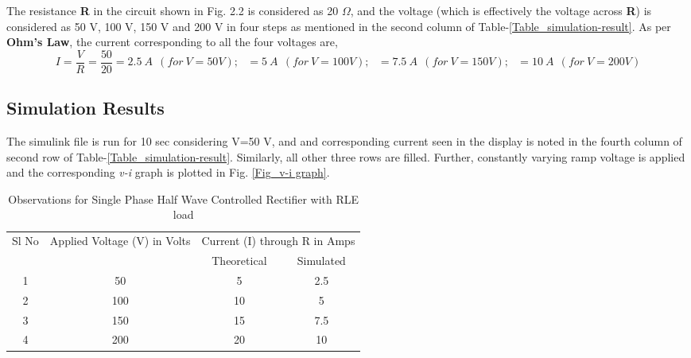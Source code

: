 \hspace{1.5cm} The resistance \textbf{R} in the circuit shown in Fig. 2.2 is considered as 20 $\Omega$, and the voltage (which is effectively the voltage across \textbf{R}) is considered as 50 V, 100 V, 150 V and 200 V in four steps as mentioned in the second column of Table-\ref{Table_simulation-result}. As per \textbf{Ohm's Law}, the current corresponding to all the four voltages are,
$$I=\frac{V}{R}=\frac{50}{20}= 2.5~A~~ (for~ V =50 V);~~~   = 5~A~~ (for~ V =100 V);~~~
    = 7.5~A~~ (for~ V =150 V);~~~= 10~A~~ (for~ V =200 V) $$


\subsection{Simulation Results}
\hspace{1.5cm} The simulink file is run for 10 sec considering V=50 V, and and corresponding current seen in the display is noted in the fourth column of second row of Table-\ref{Table_simulation-result}. Similarly, all other three rows are filled.  Further, constantly varying ramp voltage is applied and the corresponding \textit{v-i} graph is plotted in Fig. \ref{Fig_v-i graph}.




\begin{table}[h]
    \renewcommand{\arraystretch}{1.3}
    \caption{Observations for Single Phase Half Wave Controlled Rectifier with RLE load}
    \centering
    \begin{tabular}{|c|c|c|c|}
        \hline
        \multirow{2}{*}{Sl No} & \multirow{2}{*}{Applied Voltage (V) in Volts} & \multicolumn{2}{c|}{Current (I) through R in Amps}             \\
        \cline{3-4}
                               &                                               & Theoretical                                        & Simulated \\
        \hline
        1                      & 50                                            & 5                                                  & 2.5       \\
        \hline
        2                      & 100                                           & 10                                                 & 5         \\
        \hline
        3                      & 150                                           & 15                                                 & 7.5       \\
        \hline
        4                      & 200                                           & 20                                                 & 10        \\
        \hline
    \end{tabular}
\end{table}


